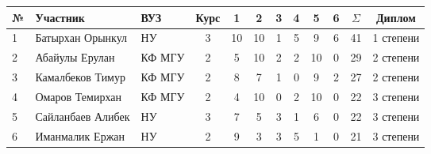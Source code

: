 \begin{center}
\begin{tabular}{|l|l|l|c|c|c|c|c|c|c|c|c|}
\hline
№ & Участник & ВУЗ & Курс & 1 & 2 & 3 & 4 & 5 & 6 & $\Sigma$ & Диплом \\
\hline
1 & Батырхан Орынкул & НУ & 3 & 10 & 10 & 1 & 5 & 9 & 6 & 41 & 1 степени \\
\hline
2 & Абайулы Ерулан & КФ МГУ & 2 & 5 & 10 & 2 & 2 & 10 & 0 & 29 & 2 степени \\
\hline
3 & Камалбеков Тимур & КФ МГУ & 2 & 8 & 7 & 1 & 0 & 9 & 2 & 27 & 2 степени \\
\hline
4 & Омаров Темирхан & КФ МГУ & 2 & 4 & 10 & 0 & 2 & 10 & 0 & 22 & 3 степени \\
\hline
5 & Сайланбаев Алибек & НУ & 3 & 7 & 5 & 3 & 1 & 6 & 0 & 22 & 3 степени \\
\hline
6 & Иманмалик Ержан & НУ & 2 & 9 & 3 & 3 & 5 & 1 & 0 & 21 & 3 степени \\
\hline
\end{tabular}
\end{center}
